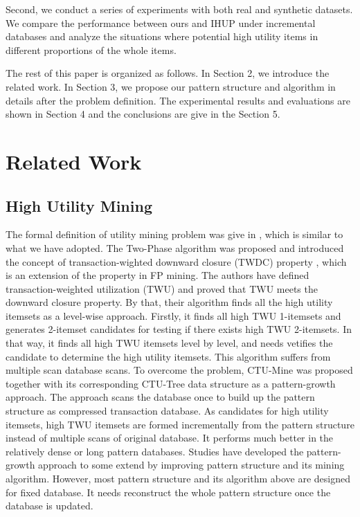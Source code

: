 \documentclass[runningheads,a4paper]{llncs}
\begin{document}
Second, we conduct a series of experiments with both real and synthetic datasets. We compare the performance between ours and IHUP under incremental databases and analyze the situations where potential high utility items in different proportions of the whole items.

The rest of this paper is organized as follows. In Section 2, we introduce the related work. In Section 3, we propose our pattern structure and algorithm in details after the problem definition. The experimental results and evaluations are shown in Section 4 and the conclusions are give in the Section 5.

\section{Related Work}
\subsection{High Utility Mining}
The formal definition of utility mining problem was give in \cite{Liu:two-phasewithCCPD,Liu:two-phase}, which is similar to what we have adopted. The Two-Phase algorithm was proposed and introduced the concept of transaction-wighted downward closure (TWDC) property , which is an extension of the property in FP mining. The authors have defined transaction-weighted utilization (TWU) and proved that TWU meets the downward closure property. By that, their algorithm finds all the high utility itemsets as a level-wise approach. Firstly, it finds all high TWU 1-itemsets and generates 2-itemset candidates for testing if there exists high TWU 2-itemsets. In that way, it finds all high TWU itemsets level by level, and needs vetifies the candidate to determine the high utility itemsets. This algorithm suffers from multiple scan database scans. To overcome the problem, CTU-Mine \cite{Erwin:CTU} was proposed together with its corresponding CTU-Tree data structure as a pattern-growth approach. The approach scans the database once to build up the pattern structure as compressed transaction database. As candidates for high utility itemsets, high TWU itemsets are formed incrementally from the pattern structure instead of multiple scans of original database. It performs much better in the relatively dense or long pattern databases. Studies \cite{Ahmed:IHUP,Lin:for-um,Tseng:up-growth} have developed the pattern-growth approach to some extend by improving pattern structure and its mining algorithm. However, most pattern structure and its algorithm above are designed for fixed database. It needs reconstruct the whole pattern structure once the database is updated.
\end{document}
